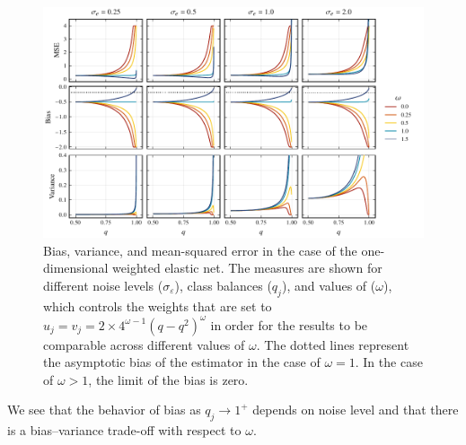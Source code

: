 \begin{figure}[htpb]
  \centering
  \includegraphics[]{plots/binary_onedim_bias_var_elnet.pdf}
  \caption{%
    Bias, variance, and mean-squared error in the case of the one-dimensional weighted elastic
    net. The measures are shown for different noise levels (\(\sigma_\varepsilon\)), class
    balances (\(q_j\)), and values of (\(\omega\)), which controls the weights that are set to
    \(u_j = v_j = 2\times 4^{\omega - 1}(q-q^2)^\omega\) in order for the results to be
    comparable across different values of \(\omega\). The dotted lines represent the asymptotic
    bias of the estimator in the case of \(\omega = 1\). In the case of \(\omega > 1\), the
    limit of the bias is zero.
  }
  \label{fig:binary-onedim-bias-var-elnet}
\end{figure}

We see that the behavior of bias as \(q_j \rightarrow 1^+\) depends on noise level and that
there is a bias--variance trade-off with respect to \(\omega\).

